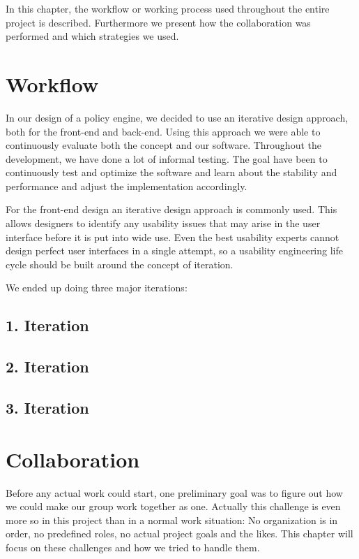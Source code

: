 In this chapter, the workflow or working process used throughout the entire project is described. Furthermore we present how the collaboration was performed and which strategies we used.

\section{Workflow} \label{sec:workflow}
In our design of a policy engine, we decided to use an iterative design approach, both for the front-end and back-end. Using this approach we were able to continuously evaluate both the concept and our software. Throughout the development, we have done a lot of informal testing. The goal have been to continuously test and optimize the software and learn about the stability and performance and adjust the implementation accordingly. 

For the front-end design an iterative design approach is commonly used. This allows designers to identify any usability issues that may arise in the user interface before it is put into wide use. Even the best usability experts cannot design perfect user interfaces in a single attempt, so a usability engineering life cycle should be built around the concept of iteration. \cite{Nielsen1993}

We ended up doing three major iterations:

\subsection{1. Iteration}



\subsection{2. Iteration}



\subsection{3. Iteration}




\section{Collaboration} \label{sec:collaboration}
Before any actual work could start, one preliminary goal was to figure out how we could make our group work together as one. Actually this challenge is even more so in this project than in a normal work situation: No organization is in order, no predefined roles, no actual project goals and the likes. This chapter will focus on these challenges and how we tried to handle them. 


